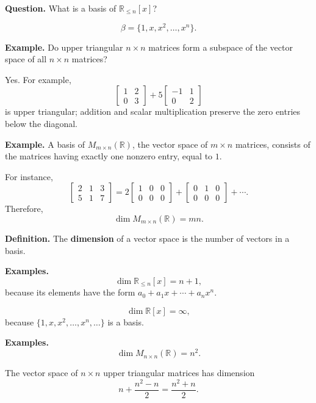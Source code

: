 \documentclass[letterpaper]{article}
\begin{document}
\textbf{Question.} What is a basis of $\mathbb{R}_{\leq n}[x]$?

\[
\beta=\{1,x,x^2,\ldots,x^n\}.
\]

\newpage

\textbf{Example.} Do upper triangular $n\times n$ matrices form a subspace of the vector space of all $n\times n$ matrices?

\medskip

Yes. For example,
\[
\begin{bmatrix}1&2\\0&3\end{bmatrix}
+5\begin{bmatrix}-1&1\\0&2\end{bmatrix}
\]
is upper triangular; addition and scalar multiplication preserve the zero entries below the diagonal.

\bigskip

\textbf{Example.} A basis of $M_{m\times n}(\mathbb{R})$, the vector space of $m\times n$ matrices, consists of the matrices having exactly one nonzero entry, equal to $1$.

For instance,
\[
\begin{bmatrix}2&1&3\\5&1&7\end{bmatrix}
=2\begin{bmatrix}1&0&0\\0&0&0\end{bmatrix}
+\begin{bmatrix}0&1&0\\0&0&0\end{bmatrix}
+\cdots.
\]
Therefore,
\[
\dim M_{m\times n}(\mathbb{R})=mn.
\]

\bigskip

\textbf{Definition.} The \textbf{dimension} of a vector space is the number of vectors in a basis.

\medskip

\textbf{Examples.}
\[
\dim\mathbb{R}_{\leq n}[x]=n+1,
\]
because its elements have the form $a_0+a_1x+\cdots+a_nx^n$.

\[
\dim\mathbb{R}[x]=\infty,
\]
because $\{1,x,x^2,\ldots,x^n,\ldots\}$ is a basis.

\newpage

\textbf{Examples.}
\[
\dim M_{n\times n}(\mathbb{R})=n^2.
\]

The vector space of $n\times n$ upper triangular matrices has dimension
\[
n+\frac{n^2-n}{2}=\frac{n^2+n}{2}.
\]
\end{document}
